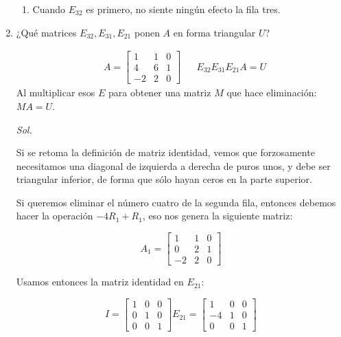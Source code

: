 \begin{enumerate}
\begin{enumerate}
		      \item  Cuando $E_{32}$ es primero,
		            no siente ningún efecto la fila tres.

	      \end{enumerate}

	\item ¿Qué matrices $E_{32}, E_{31},E_{21}$ ponen $A$ en forma triangular $U$?

	      \begin{align}
		       & A= \begin{bmatrix} 1& 1& 0\\ 4& 6& 1 \\-2& 2& 0 \end{bmatrix} &  & E_{32}E_{31}E_{21}A=U
	      \end{align}
	      Al multiplicar esos $E$ para obtener una matriz $M$ que hace eliminación: $M A = U$.

	      \textit{ Sol. }

	      Si se retoma la definición de matriz identidad, vemos que forzosamente necesitamos una diagonal de izquierda a derecha de puros unos, y debe ser triangular inferior, de forma que sólo hayan ceros en la parte superior.

	      Si queremos eliminar el número cuatro de la segunda fila, entonces debemos hacer la operación $-4R_{1}+R_{1}$, eso nos genera la siguiente matriz:

	      \begin{equation*}
		      A_{1}= \begin{bmatrix}
			      1 & 1 & 0 \\0&2&1\\-2&2&0
		      \end{bmatrix}
	      \end{equation*}

	      Usamos entonces la matriz identidad en $E_{21}$:

	      \begin{equation*}
		      I=\begin{bmatrix}
			      1 & 0 & 0 \\ 0& 1& 0 \\0& 0& 1
		      \end{bmatrix} E_{21}= \begin{bmatrix}
			      1 & 0 & 0 \\ -4& 1& 0 \\0& 0& 1
		      \end{bmatrix}
	      \end{equation*}


\end{enumerate}
